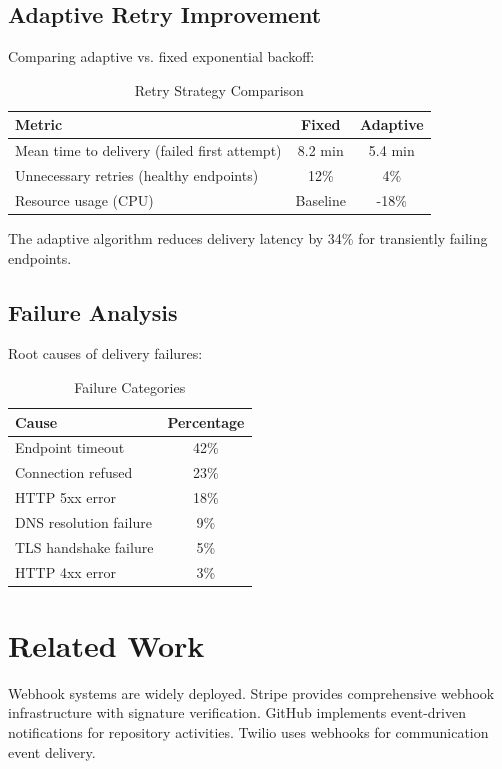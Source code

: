 \documentclass[11pt,a4paper]{article}
\begin{document}
\subsection{Adaptive Retry Improvement}

Comparing adaptive vs. fixed exponential backoff:

\begin{table}[h]
\centering
\caption{Retry Strategy Comparison}
\begin{tabular}{lcc}
\toprule
\textbf{Metric} & \textbf{Fixed} & \textbf{Adaptive} \\
\midrule
Mean time to delivery (failed first attempt) & 8.2 min & 5.4 min \\
Unnecessary retries (healthy endpoints) & 12\% & 4\% \\
Resource usage (CPU) & Baseline & -18\% \\
\bottomrule
\end{tabular}
\end{table}

The adaptive algorithm reduces delivery latency by 34\% for transiently failing endpoints.

\subsection{Failure Analysis}

Root causes of delivery failures:

\begin{table}[h]
\centering
\caption{Failure Categories}
\begin{tabular}{lc}
\toprule
\textbf{Cause} & \textbf{Percentage} \\
\midrule
Endpoint timeout & 42\% \\
Connection refused & 23\% \\
HTTP 5xx error & 18\% \\
DNS resolution failure & 9\% \\
TLS handshake failure & 5\% \\
HTTP 4xx error & 3\% \\
\bottomrule
\end{tabular}
\end{table}

\section{Related Work}

Webhook systems are widely deployed. Stripe \cite{stripe2019} provides comprehensive webhook infrastructure with signature verification. GitHub \cite{github2019} implements event-driven notifications for repository activities. Twilio \cite{twilio2019} uses webhooks for communication event delivery.
\end{document}
